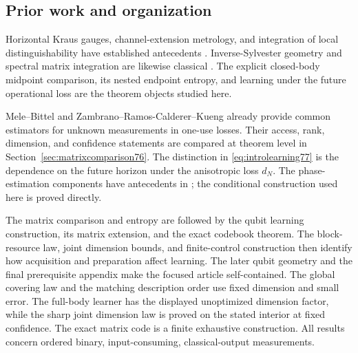 \subsection{Prior work and organization}
Horizontal Kraus gauges, channel-extension metrology, and integration
of local distinguishability have established antecedents
\cite{FI76,DKG67,DM76,KGAD76,YF76,SD76}.
Inverse-Sylvester geometry and spectral matrix integration are likewise
classical \cite{Dittmann76,SZGeom76}. The explicit closed-body
midpoint comparison, its nested endpoint entropy, and learning under
the future operational loss are the theorem objects studied here.

Mele--Bittel \cite{MB67} and
Zambrano--Ramos-Calderer--Kueng \cite{ZRK76} already provide common
estimators for unknown measurements in one-use losses. Their access,
rank, dimension, and confidence statements are compared at theorem
level in Section~\ref{sec:matrixcomparison76}. The distinction in
\eqref{eq:introlearning77} is the dependence on the future horizon
under the anisotropic loss $d_N$. The phase-estimation components
have antecedents in \cite{HB76,KLY76}; the conditional construction
used here is proved directly.

The matrix comparison and entropy are followed by the qubit learning
construction, its matrix extension, and the exact codebook theorem.
The block-resource law, joint dimension bounds, and finite-control
construction then identify how acquisition and preparation affect learning. The later qubit geometry and the final prerequisite
appendix make the focused article self-contained. The global covering law and the matching description order use fixed
dimension and small error.  The full-body learner has the displayed
unoptimized dimension factor, while the sharp joint dimension law is
proved on the stated interior at fixed confidence.  The exact matrix
code is a finite exhaustive construction.  All results concern ordered
binary, input-consuming, classical-output measurements.
